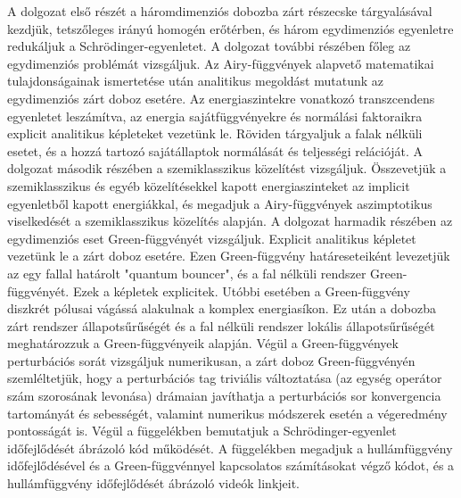 A dolgozat első részét a háromdimenziós dobozba zárt részecske tárgyalásával kezdjük, tetszőleges irányú homogén erőtérben, és három egydimenziós egyenletre redukáljuk a Schrödinger-egyenletet. A dolgozat további részében főleg az egydimenziós problémát vizsgáljuk. Az Airy-függvények alapvető matematikai tulajdonságainak ismertetése után analitikus megoldást mutatunk az egydimenziós zárt doboz esetére. Az energiaszintekre vonatkozó transzcendens egyenletet leszámítva, az energia sajátfüggvényekre és normálási faktoraikra explicit analitikus képleteket vezetünk le. Röviden tárgyaljuk a falak nélküli esetet, és a hozzá tartozó sajátállaptok normálását és teljességi relációját.
A dolgozat második részében a szemiklasszikus közelítést vizsgáljuk. Összevetjük a szemiklasszikus és egyéb közelítésekkel kapott energiaszinteket az implicit egyenletből kapott energiákkal, és megadjuk a Airy-függvények aszimptotikus viselkedését a szemiklasszikus közelítés alapján.
A dolgozat harmadik részében az egydimenziós eset Green-függvényét vizsgáljuk. Explicit analitikus képletet vezetünk le a zárt doboz esetére. Ezen Green-függvény határeseteiként levezetjük az egy fallal határolt "quantum bouncer", és a fal nélküli rendszer Green-függvényét. Ezek a képletek explicitek. Utóbbi esetében a Green-függvény diszkrét pólusai vágássá alakulnak a komplex energiasíkon. Ez után a dobozba zárt rendszer állapotsűrűségét és a fal nélküli rendszer lokális állapotsűrűségét meghatározzuk a Green-függvényeik alapján. Végül a Green-függvények perturbációs sorát vizsgáljuk numerikusan, a zárt doboz Green-függvényén szemléltetjük, hogy a perturbációs tag triviális változtatása (az egység operátor szám szorosának levonása) drámaian javíthatja a perturbációs sor konvergencia tartományát és sebességét, valamint numerikus módszerek esetén a végeredmény pontosságát is. Végül a függelékben bemutatjuk a Schrödinger-egyenlet időfejlődését ábrázoló kód működését. A függelékben megadjuk a hullámfüggvény időfejlődésével és a Green-függvénnyel kapcsolatos számításokat végző kódot, és a hullámfüggvény időfejlődését ábrázoló videók linkjeit.